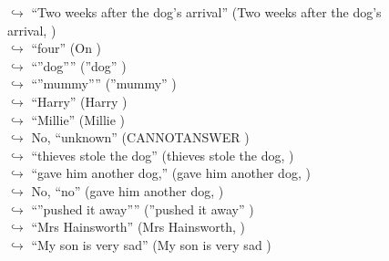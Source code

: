 \documentclass[11pt,a4paper, onecolumn]{article}
\begin{document}
\begin{figure}[t] \small \begin{tcolorbox}[boxsep=0pt,left=5pt,right=0pt,top=2pt,colback = yellow!5] \begin{dialogue}
 \small 
\colorbox{pink!25}{$\hookrightarrow$}
{ ``Two weeks after the dog's arrival'' (Two weeks after the dog's arrival, ) }
\\
\colorbox{pink!25}{$\hookrightarrow$}
{ ``four'' (On ) }
\\
\colorbox{pink!25}{$\hookrightarrow$}
{ ``''dog'''' (''dog'' ) }
\\
\colorbox{pink!25}{$\hookrightarrow$}
{ ``''mummy'''' (''mummy'' ) }
\\
\colorbox{pink!25}{$\hookrightarrow$}
{ ``Harry'' (Harry ) }
\\
\colorbox{pink!25}{$\hookrightarrow$}
{ ``Millie'' (Millie ) }
\\
\colorbox{pink!25}{$\hookrightarrow$}
\colorbox{red!25}{No,}
{ ``unknown'' (CANNOTANSWER ) }
\\
\colorbox{pink!25}{$\hookrightarrow$}
{ ``thieves stole the dog'' (thieves stole the dog, ) }
\\
\colorbox{pink!25}{$\hookrightarrow$}
{ ``gave him another dog,'' (gave him another dog, ) }
\\
\colorbox{pink!25}{$\hookrightarrow$}
\colorbox{red!25}{No,}
{ ``no'' (gave him another dog, ) }
\\
\colorbox{pink!25}{$\hookrightarrow$}
{ ``''pushed it away'''' (''pushed it away'' ) }
\\
\colorbox{pink!25}{$\hookrightarrow$}
{ ``Mrs Hainsworth'' (Mrs Hainsworth, ) }
\\
\colorbox{pink!25}{$\hookrightarrow$}
{ ``My son is very sad'' (My son is very sad ) }

\end{dialogue}
\end{tcolorbox}
\end{figure}
\end{document}
